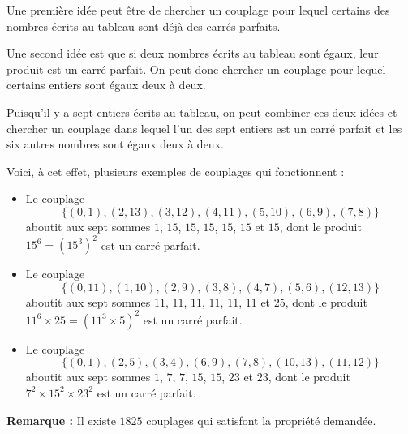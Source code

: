 Une première idée peut être de chercher un couplage pour lequel certains des nombres écrits au tableau sont déjà des carrés parfaits.

Une second idée est que si deux nombres écrits au tableau sont égaux, leur produit est un carré parfait. On peut donc chercher un couplage pour lequel certains entiers sont égaux deux à deux.

Puisqu'il y a sept entiers écrits au tableau, on peut combiner ces deux idées et chercher un couplage dans lequel l'un des sept entiers est un carré parfait et les six autres nombres sont égaux deux à deux. 

Voici, à cet effet, plusieurs exemples de couplages qui fonctionnent :

\begin{itemize}
\item Le couplage
$$\{(0,1), (2,13), (3,12),(4,11),(5,10),(6,9), (7,8)\}$$
aboutit aux sept sommes $1$, $15$, $15$, $15$, $15$, $15$ et $15$, dont le produit $15^6=(15^3)^2$ est un carré parfait.

\item Le couplage
$$\{(0,11),(1,10),(2,9),(3,8),(4,7),(5,6),(12,13)\}$$
aboutit aux sept sommes $11$, $11$, $11$, $11$, $11$, $11$ et $25$, dont le produit $11^6\times 25= (11^3\times 5)^2$ est un carré parfait. 

\item Le couplage 
$$\{(0,1),(2,5),(3,4),(6,9),(7,8),(10,13),(11,12)\}$$
aboutit aux sept sommes $1$, $7$, $7$, $15$, $15$, $23$ et $23$, dont le produit $7^2\times 15^2\times 23^2$ est un carré parfait. 
\end{itemize}

\textbf{Remarque :} Il existe $1825$ couplages qui satisfont la propriété demandée.